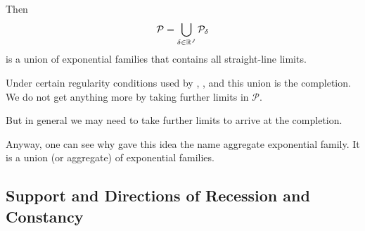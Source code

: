 Then
$$
   \mathcal{P} = \bigcup_{\delta \in \mathbb{R}^J} \mathcal{P}_\delta
$$
is a union of exponential families that contains all straight-line limits.

Under certain regularity conditions used by \citet{barndorff-nielsen},
\citet{brown}, and \citet{geyer-gdor} this union is the completion.
We do not get anything more by taking further limits in $\mathcal{P}$.

But in general \citet[Chapters~2 and~4]{geyer-thesis} we may need to take
further limits to arrive at the completion.

Anyway, one can see why \citet{brown} gave this idea the name aggregate
exponential family.  It is a union (or aggregate) of exponential families.

\subsection{Support and Directions of Recession and Constancy}

